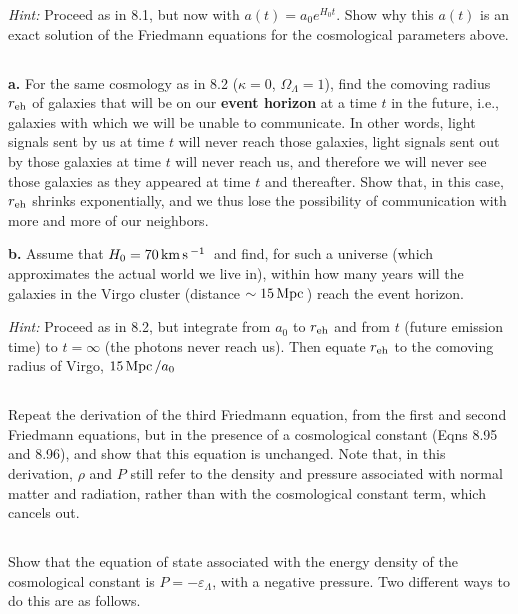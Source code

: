 \documentclass[12pt]{article}
\begin{document}
\textit{Hint:} Proceed as in 8.1, but now with \(a(t) = a_0e^{H_0t}\). Show why this \(a(t)\) is an exact solution of the Friedmann equations for the cosmological parameters above.

\subsection{} %

\textbf{a.} For the same cosmology as in 8.2 (\(\kappa=0\), \(\Omega_\Lambda = 1\)), find the comoving radius \(r_\mathrm{eh}\) of galaxies that will be on our \textbf{event horizon} at a time \(t\) in the future, i.e., galaxies with which we will be unable to communicate. In other words, light signals sent by us at time \(t\) will never reach those galaxies, light signals sent out by those galaxies at time \(t\) will never reach us, and therefore we will never see those galaxies as they appeared at time \(t\) and thereafter. Show that, in this case, \(r_\mathrm{eh}\) shrinks exponentially, and we thus lose the possibility of communication with more and more of our neighbors.

\textbf{b.} Assume that \(H_0 = 70\, \mathrm{km\,}\mathrm{s}\,^{-1}\,\) and find, for such a universe (which approximates the actual world we live in), within how many years will the galaxies in the Virgo cluster (distance  \(\sim 15\, \mathrm{Mpc}\,\)) reach the event horizon.

\textit{Hint:} Proceed as in 8.2, but integrate from \(a_0\) to \(r_\mathrm{eh}\) and from \(t\) (future emission time)  to \(t = \infty\) (the photons never reach us). Then equate \(r_\mathrm{eh}\) to the comoving radius of Virgo, \( 15\,\mathrm{Mpc}\,/a_0\)

\subsection{} %

Repeat the derivation of the third Friedmann equation, from the first and second Friedmann equations, but in the presence of a cosmological constant (Eqns 8.95 and 8.96), and show that this equation is unchanged. Note that, in this derivation, \(\rho\) and \(P\) still refer to the density and pressure associated with normal matter and radiation, rather than with the cosmological constant term, which cancels out.

\subsection{} %

Show that the equation of state associated with the energy density of the cosmological constant is \(P = -\varepsilon_\Lambda\), with a negative pressure. Two different ways to do this are as follows. \newline
\end{document}
